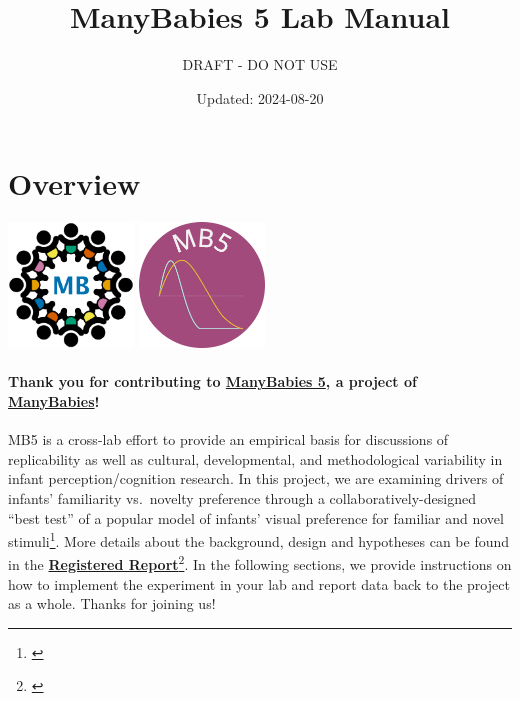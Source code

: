 \documentclass[
]{book}
\title{ManyBabies 5 Lab Manual}
\subtitle{DRAFT - DO NOT USE}
\author{}
\date{\vspace{-2.5em}Updated: 2024-08-20}
\begin{document}
\maketitle

{
\setcounter{tocdepth}{1}
\tableofcontents
}
\chapter*{Overview}\label{overview}

\includegraphics[width=0.25\textwidth,height=\textheight]{images/mb-logo.png} \includegraphics[width=0.25\textwidth,height=\textheight]{images/mb5-logo.png}

\subsubsection*{\texorpdfstring{Thank you for contributing to \href{https://manybabies.org/MB5/}{\textbf{ManyBabies 5}}, a project of \href{https://manybabies.org/}{\textbf{ManyBabies}}!}{Thank you for contributing to ManyBabies 5, a project of ManyBabies!}}\label{thank-you-for-contributing-to-manybabies-5-a-project-of-manybabies}

MB5 is a cross-lab effort to provide an empirical basis for discussions of replicability as well as cultural, developmental, and methodological variability in infant perception/cognition research. In this project, we are examining drivers of infants' familiarity vs.~novelty preference through a collaboratively-designed ``best test'' of a popular model of infants' visual preference for familiar and novel stimuli\footnote{\citet{hunterames}}. More details about the background, design and hypotheses can be found in the \href{https://osf.io/preprints/psyarxiv/ck3vd}{\textbf{Registered Report}}\footnote{\citet{kosiezettersten2024}}. In the following sections, we provide instructions on how to implement the experiment in your lab and report data back to the project as a whole. Thanks for joining us!
\end{document}

